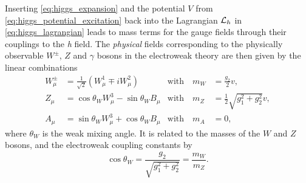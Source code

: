 Inserting \cref{eq:higgs_expansion} and the potential $V$ from \cref{eq:higgs_potential_excitation} back into the Lagrangian $\mathcal{L}_h$ in \cref{eq:higgs_lagrangian} leads to mass terms for the gauge fields through their couplings to the \textit{h} field. The \textit{physical} fields corresponding to the physically observable $W^\pm$, $Z$ and $\gamma$ bosons in the electroweak theory are then given by the linear combinations
\begin{align*}
	W^\pm_\mu 	& = \frac{1}{\sqrt{2}}(W^1_\mu\mp i W^2_\mu) 				& \textrm{with} \quad m_W  & = \frac{g_2}{2}v, \\
	Z_\mu 		& = \cos\theta_W W_\mu^3 - \sin\theta_W B_\mu 	& \textrm{with} \quad m_Z  & = \frac{1}{2}\sqrt{g_1^2+g_2^2}v, \\
	A_\mu 		& = \sin\theta_W W_\mu^3 + \cos\theta_W B_\mu 	& \textrm{with} \quad m_A  & = 0,
\end{align*}
where $\theta_W$ is the weak mixing angle. It is related to the masses of the $W$ and $Z$ bosons, and the electroweak coupling constants by
\begin{equation}
	\cos{\theta_W} = \frac{g_2}{\sqrt{g_1^2 + g_2^2}} = \frac{m_W}{m_Z}.
\end{equation} 

